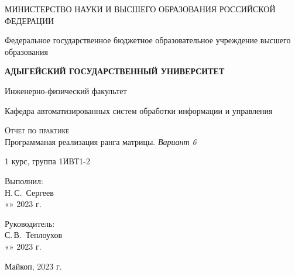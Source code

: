 \documentclass[12pt,a4paper]{scrartcl}
\begin{document}
 \begin{titlepage}
  \begin{center}
   \large
   МИНИСТЕРСТВО НАУКИ И ВЫСШЕГО ОБРАЗОВАНИЯ РОССИЙСКОЙ ФЕДЕРАЦИИ
   
   Федеральное государственное бюджетное образовательное учреждение высшего образования
   
   \textbf{АДЫГЕЙСКИЙ ГОСУДАРСТВЕННЫЙ УНИВЕРСИТЕТ}
   \vspace{0.25cm}
   
   Инженерно-физический факультет
   
   Кафедра автоматизированных систем обработки информации и управления
   \vfill

   \vfill
   
   \textsc{Отчет по практике}\\[5mm]
   
   {\LARGE Программаная реализация ранга матрицы. \textit{Вариант 6}}
   \bigskip
   
   1 курс, группа 1ИВТ1-2
  \end{center}
  \vfill
  
  \newlength{\ML}
  \hfill\begin{minipage}{0.5\textwidth}
   Выполнил:\\
   \underline{\hspace{\ML}} Н.\,С.~Сергеев\\
   «\underline{\hspace{0.7cm}}» \underline{\hspace{2cm}} 2023 г.
  \end{minipage}%
  \bigskip
  
  \hfill\begin{minipage}{0.5\textwidth}
   Руководитель:\\
   \underline{\hspace{\ML}} С.\,В.~Теплоухов\\
   «\underline{\hspace{0.7cm}}» \underline{\hspace{2cm}} 2023 г.
  \end{minipage}%
  \vfill
  
  \begin{center}
   Майкоп, 2023 г.
  \end{center}
 \end{titlepage}
 
\end{document}
